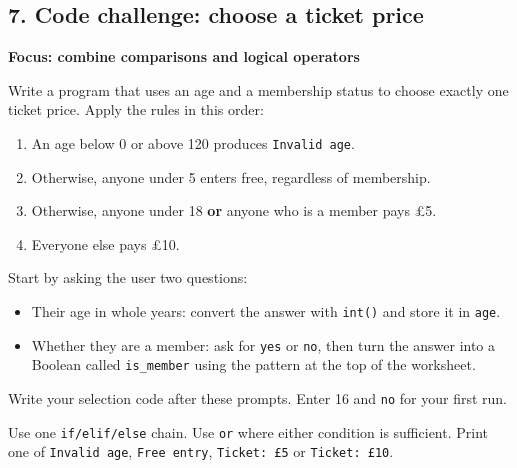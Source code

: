 \documentclass[12pt,a4paper]{article}
\begin{document}
\subsection*{7. Code challenge: choose a ticket price}
\textbf{Focus: combine comparisons and logical operators}

Write a program that uses an age and a membership status to choose exactly one ticket price. Apply the rules in this order:

\begin{enumerate}
\item An age below 0 or above 120 produces \texttt{Invalid age}.
\item Otherwise, anyone under 5 enters free, regardless of membership.
\item Otherwise, anyone under 18 \textbf{or} anyone who is a member pays £5.
\item Everyone else pays £10.
\end{enumerate}
Start by asking the user two questions:

\begin{itemize}
\item Their age in whole years: convert the answer with \texttt{int()} and store it in \texttt{age}.
\item Whether they are a member: ask for \texttt{yes} or \texttt{no}, then turn the answer into a Boolean called \texttt{is\_member} using the pattern at the top of the worksheet.
\end{itemize}
Write your selection code after these prompts. Enter 16 and \texttt{no} for your first run.

Use one \texttt{if/elif/else} chain. Use \texttt{or} where either condition is sufficient. Print one of \texttt{Invalid age}, \texttt{Free entry}, \texttt{Ticket: £5} or \texttt{Ticket: £10}.
\end{document}
